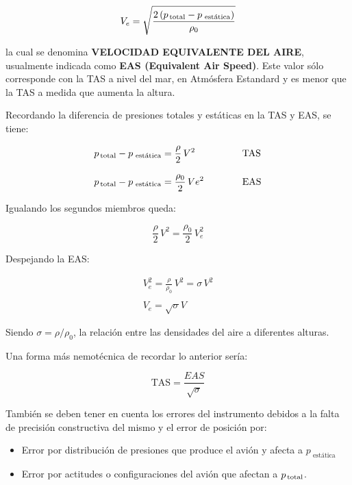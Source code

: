 \documentclass[a4paper,12pt,twoside]{article}
\begin{document}
\begin{equation*}
  \displaystyle
	V_e = \sqrt{\frac{2 \left(p_{\text{\,total}} -p_{\text{ est\'atica}} \right)}{\rho_0}}
\end{equation*}

la cual se denomina {\bf VELOCIDAD EQUIVALENTE DEL AIRE}, 
usualmente indicada como {\bf EAS (Equivalent Air Speed)}. 
Este valor sólo corresponde con la TAS a nivel del mar, 
en Atmósfera Estandard y es menor que la TAS a medida que aumenta la altura.

Recordando la diferencia de presiones totales y estáticas en la TAS y EAS, se tiene:

\begin{equation*}
  \begin{array}{lcl}
    p_{\text{\,total}}   - p_{\text{ est\'atica}} = \displaystyle \frac{\rho}{2} \, V^2 & \qquad & \text{TAS} \\
	& & \\
    p_{\text{\,total}}   - p_{\text{ est\'atica}} = \displaystyle \frac{\rho_0}{2} \, Ve^2 & \qquad & \text{EAS} \\
  \end{array}
\end{equation*}

Igualando los segundos miembros queda:

\[
	\displaystyle \frac{\rho}{2} \, V^2
	=
	\displaystyle \frac{\rho_0}{2} \, V_e^2
\]

Despejando la EAS:

\[	\begin{array}{c}
  	V_e^2 = \displaystyle \frac{\rho}{\rho_0}\,V^2 = \sigma \,V^2  \\
	\\
	V_e = \sqrt{\sigma}  V
	\end{array}
\]

Siendo $\sigma = \rho / \rho_0$, la relaci\'on entre las densidades del aire a diferentes
alturas.

Una forma m\'as nemot\'ecnica de recordar lo anterior ser\'ia:

\[\displaystyle
	\text{TAS} = \frac{EAS}{\sqrt{\sigma}}
\]

También se deben tener en cuenta los errores del instrumento debidos a la falta de precisión constructiva del mismo y el error de posición por:

\begin{itemize}
\item Error por distribución de presiones que produce el avión y
  afecta a $p_{\text{ est\'atica}}$
\item Error por actitudes o configuraciones del avión que
  afectan a $p_{\text{\,total}} $.
\end{itemize}
\end{document}
